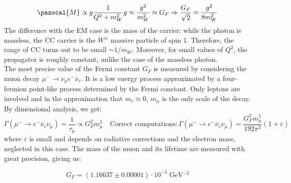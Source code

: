 \documentclass[10.75pt,a4paper,openright,bottom=2cm]{article}
\newcommand{\beginbox}[1]{\begin{tcolorbox}[width=\textwidth,colback={yellow!50},title={#1},colbacktitle={gray!50},coltitle=black]}
\renewcommand{\endbox}{\end{tcolorbox}\noindent}
\begin{document}
\[
\pazocal{M}\propto g\frac{1}{Q^2+m_W^2}g\approx\frac{g^2}{m_W^2}\approx G_F\Rightarrow\frac{G_F}{\sqrt{2}}=\frac{g^2}{8m_W^2}
\]
The difference with the EM case is the mass of the carrier: while the photon is massless, the CC carrier is the $W^\pm$ massive particle of spin 1. Therefore, the range of CC turns out to be small $\sim1/m_W$. Moreover, for small values of $Q^2$, the propagator is roughly constant, unlike the case of the massless photon.\\
The most precise value of the Fermi constant $G_F$ is measured by considering the muon decay $\mu^-\to\nu_\mu e^-\overline{\nu}_e$. It is a low energy process approximated by a four-fermion point-like process determined by the Fermi constant. Only leptons are involved and in the approximation that $m_e\approx0$, $m_\mu$ is the only scale of the decay. By dimensional analysis, we get:
\[
\Gamma(\mu^-\to e^-\overline{\nu}_e\nu_\mu)=\frac{1}{\tau_\mu}\propto G_F^2m_\mu^5 \quad \text{Correct computations:}\,\Gamma(\mu^-\to e^-\overline{\nu}_e\nu_\mu)=\frac{G_F^2m_\mu^5}{192\pi^3}(1+\varepsilon)
\]
where $\varepsilon$ is small and depends on radiative corrections and the electron mass, neglected in this case. The mass of the muon and its lifetime are measured with great precision, giving us:
\beginbox{Fermi Constant}
\[
G_F=(1.16637\pm0.00001)\cdot10^{-5}\;\text{GeV$^{-2}$}
\]
\endbox
\end{document}
